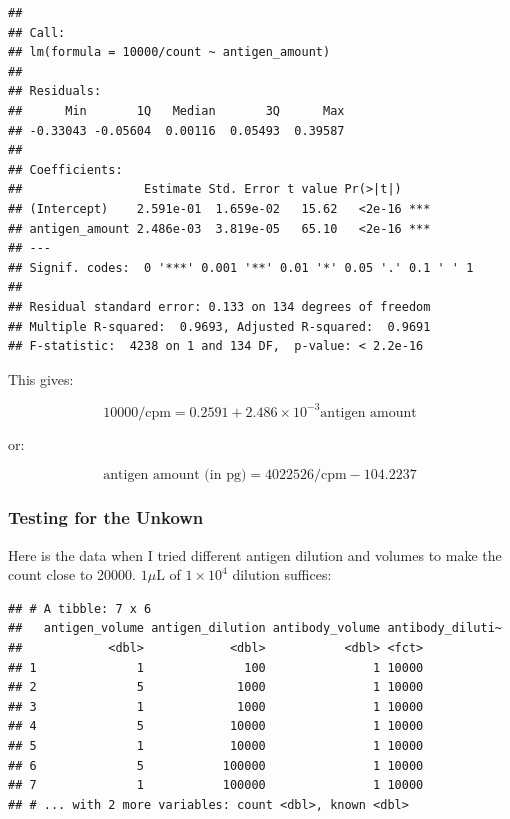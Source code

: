 \documentclass[
]{article}
\newenvironment{Shaded}{\begin{snugshade}}{\end{snugshade}}
\newcommand{\DataTypeTok}[1]{\textcolor[rgb]{0.13,0.29,0.53}{#1}}
\newcommand{\DecValTok}[1]{\textcolor[rgb]{0.00,0.00,0.81}{#1}}
\newcommand{\KeywordTok}[1]{\textcolor[rgb]{0.13,0.29,0.53}{\textbf{#1}}}
\newcommand{\NormalTok}[1]{#1}
\newcommand{\OperatorTok}[1]{\textcolor[rgb]{0.81,0.36,0.00}{\textbf{#1}}}
\newcommand{\StringTok}[1]{\textcolor[rgb]{0.31,0.60,0.02}{#1}}
\begin{document}
\begin{verbatim}
## 
## Call:
## lm(formula = 10000/count ~ antigen_amount)
## 
## Residuals:
##      Min       1Q   Median       3Q      Max 
## -0.33043 -0.05604  0.00116  0.05493  0.39587 
## 
## Coefficients:
##                 Estimate Std. Error t value Pr(>|t|)    
## (Intercept)    2.591e-01  1.659e-02   15.62   <2e-16 ***
## antigen_amount 2.486e-03  3.819e-05   65.10   <2e-16 ***
## ---
## Signif. codes:  0 '***' 0.001 '**' 0.01 '*' 0.05 '.' 0.1 ' ' 1
## 
## Residual standard error: 0.133 on 134 degrees of freedom
## Multiple R-squared:  0.9693, Adjusted R-squared:  0.9691 
## F-statistic:  4238 on 1 and 134 DF,  p-value: < 2.2e-16
\end{verbatim}

This gives:

\[10000/\text{cpm} = 0.2591 + 2.486\times10^{-3}\text{antigen amount}\]

or:

\[\text{antigen amount (in pg)}=4022526/\text{cpm} - 104.2237\]

\hypertarget{testing-for-the-unkown}{%
\subsubsection*{Testing for the Unkown}\label{testing-for-the-unkown}}

Here is the data when I tried different antigen dilution and volumes to make the count close to 20000. \(1\mu\text{L}\) of \(1\times10^4\) dilution suffices:

\begin{Shaded}
\end{Shaded}

\begin{verbatim}
## # A tibble: 7 x 6
##   antigen_volume antigen_dilution antibody_volume antibody_diluti~
##            <dbl>            <dbl>           <dbl> <fct>           
## 1              1              100               1 10000           
## 2              5             1000               1 10000           
## 3              1             1000               1 10000           
## 4              5            10000               1 10000           
## 5              1            10000               1 10000           
## 6              5           100000               1 10000           
## 7              1           100000               1 10000           
## # ... with 2 more variables: count <dbl>, known <dbl>
\end{verbatim}
\end{document}
